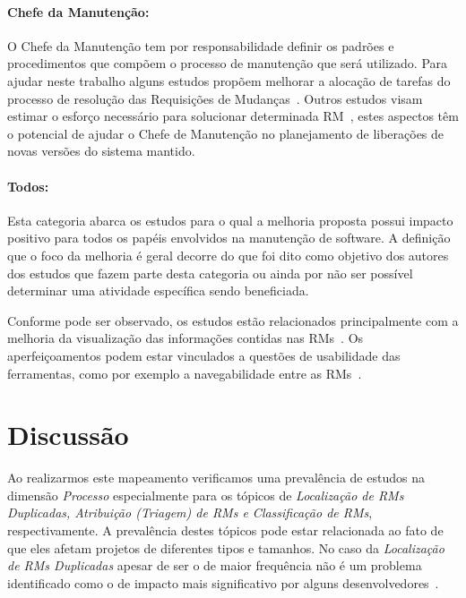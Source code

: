 \paragraph{Chefe da Manutenção:}

O Chefe da Manutenção tem por responsabilidade definir os padrões e
procedimentos que compõem o processo de manutenção que será utilizado. Para
ajudar neste trabalho alguns estudos propõem melhorar a alocação de tarefas do
processo de resolução das Requisições de Mudanças~\cite{netto2010automated}.
Outros estudos visam estimar o esforço necessário para solucionar determinada
RM~\cite{Vijayakumar2014, Nagwani2010}, estes aspectos têm o potencial de ajudar
o Chefe de Manutenção no planejamento de liberações de novas versões do sistema
mantido.

\paragraph{Todos:}

Esta categoria abarca os estudos para o qual a melhoria proposta possui impacto
positivo para todos os papéis envolvidos na manutenção de software. A definição
que o foco da melhoria é geral decorre do que foi dito como objetivo dos autores
dos estudos que fazem parte desta categoria ou ainda por não ser possível
determinar uma atividade específica sendo beneficiada.

Conforme pode ser observado, os estudos estão relacionados principalmente com a
melhoria da  visualização das informações contidas nas RMs~\cite{hora2012bug,
	takama2013application, dal2014bug}. Os aperfeiçoamentos podem estar
vinculados a questões de usabilidade das ferramentas, como por exemplo a
navegabilidade entre as RMs~\cite{dal2014bug}.

\section{Discussão}
\label{sec:discussao}

Ao realizarmos este mapeamento verificamos uma prevalência de estudos na
dimensão \textit{Processo} especialmente para os tópicos de \textit{Localização
    de RMs Duplicadas, Atribuição (Triagem) de RMs e Classificação de RMs},
respectivamente. A prevalência destes tópicos pode estar relacionada ao fato de
que eles afetam projetos de diferentes tipos e tamanhos. No caso da
\textit{Localização de RMs Duplicadas} apesar de ser o de maior frequência não é
um problema identificado como o de impacto mais significativo por alguns
desenvolvedores~\cite{bettenburg2008makes}.

